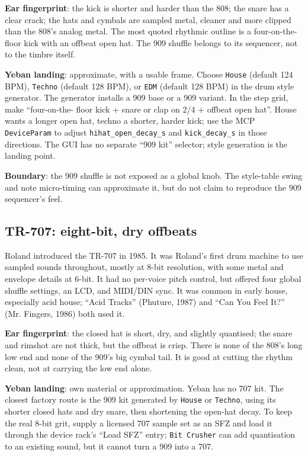 \textbf{Ear fingerprint}: the kick is shorter and harder than the 808; the
snare has a clear crack; the hats and cymbals are sampled metal, cleaner and
more clipped than the 808's analog metal. The most quoted rhythmic outline is
a four-on-the-floor kick with an offbeat open hat. The 909 shuffle belongs to
its sequencer, not to the timbre itself.

\textbf{Yeban landing}: approximate, with a usable frame. Choose
\texttt{House} (default 124 BPM), \texttt{Techno} (default 128 BPM), or
\texttt{EDM} (default 128 BPM) in the drum style generator. The generator
installs a 909 base or a 909 variant. In the step grid, make ``four-on-the-
floor kick + snare or clap on 2/4 + offbeat open hat''. House wants a longer
open hat, techno a shorter, harder kick; use the MCP \texttt{DeviceParam} to
adjust \texttt{hihat\_open\_decay\_s} and \texttt{kick\_decay\_s} in those
directions. The GUI has no separate ``909 kit'' selector; style generation is
the landing point.

\textbf{Boundary}: the 909 shuffle is not exposed as a global knob. The
style-table swing and note micro-timing can approximate it, but do not claim
to reproduce the 909 sequencer's feel.

\subsection{TR-707: eight-bit, dry offbeats}
\label{sec:iconic-707}

Roland introduced the TR-707 in 1985. It was Roland's first drum machine to
use sampled sounds throughout, mostly at 8-bit resolution, with some metal
and envelope details at 6-bit. It had no per-voice pitch control, but offered
four global shuffle settings, an LCD, and MIDI/DIN sync. It was common in
early house, especially acid house; ``Acid Tracks'' (Phuture, 1987) and
``Can You Feel It?'' (Mr. Fingers, 1986) both used it.

\textbf{Ear fingerprint}: the closed hat is short, dry, and slightly
quantised; the snare and rimshot are not thick, but the offbeat is crisp.
There is none of the 808's long low end and none of the 909's big cymbal
tail. It is good at cutting the rhythm clean, not at carrying the low end
alone.

\textbf{Yeban landing}: own material or approximation. Yeban has no 707 kit.
The closest factory route is the 909 kit generated by \texttt{House} or
\texttt{Techno}, using its shorter closed hats and dry snare, then shortening
the open-hat decay. To keep the real 8-bit grit, supply a licensed 707 sample
set as an SFZ and load it through the device rack's ``Load SFZ'' entry;
\texttt{Bit Crusher} can add quantisation to an existing sound, but it cannot
turn a 909 into a 707.

